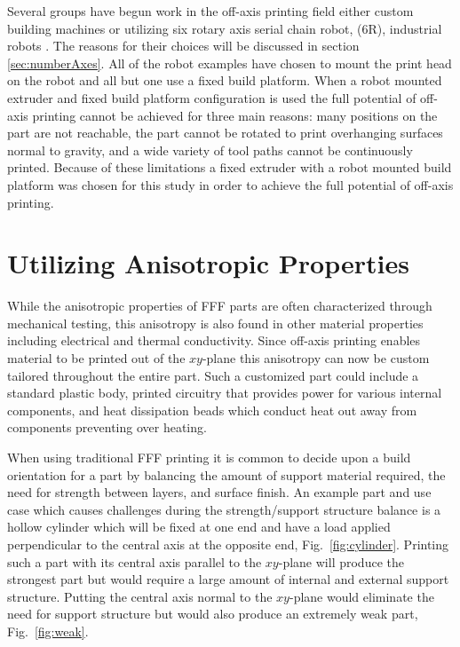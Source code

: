 \documentclass[main.tex]{subfiles}
\begin{document}
Several groups have begun work in the off-axis printing field either custom building machines \cite{Song2015, Yerazunis2016} or utilizing six rotary axis serial chain robot, (6R), industrial robots \cite{Hedges2014, Arevo2015, Vurpillat2016}.
%
The reasons for their choices will be discussed in section \ref{sec:numberAxes}.
All of the robot examples have chosen to mount the print head on the robot and all but one use a fixed build platform.
When a robot mounted extruder and fixed build platform configuration is used the full potential of off-axis printing cannot be achieved for three main reasons: many positions on the part are not reachable, the part cannot be rotated to print overhanging surfaces normal to gravity, and a wide variety of tool paths cannot be continuously printed.
Because of these limitations a fixed extruder with a robot mounted build platform was chosen for this study in order to achieve the full potential of off-axis printing.

\section{Utilizing Anisotropic Properties}
While the anisotropic properties of FFF parts are often characterized through mechanical testing, this anisotropy is also found in other material properties including electrical and thermal conductivity.
Since off-axis printing enables material to be printed out of the $xy$\nobreakdash-plane this anisotropy can now be custom tailored throughout the entire part.
Such a customized part could include a standard plastic body, printed circuitry that provides power for various internal components, and heat dissipation beads which conduct heat out away from components preventing  over heating.

When using traditional FFF printing it is common to decide upon a build orientation for a part by balancing the amount of support material required, the need for strength between layers, and surface finish.
An example part and use case which causes challenges during the strength/support structure balance is a hollow cylinder which will be fixed at one end and have a load applied perpendicular to the central axis at the opposite end, Fig.~\ref{fig:cylinder}.
Printing such a part with its central axis parallel to the $xy$\nobreakdash-plane will produce the strongest part but would require a large amount of internal and external support structure.
Putting the central axis normal to the $xy$\nobreakdash-plane would eliminate the need for support structure but would also produce an extremely weak part, Fig.~\ref{fig:weak}.
\end{document}
